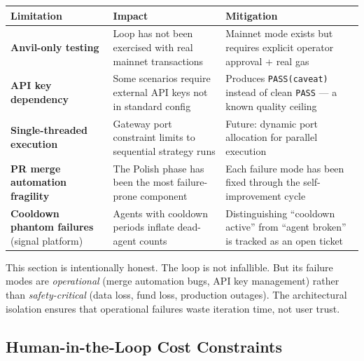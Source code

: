 \documentclass[11pt,a4paper]{article}
\newcounter{none} %
\begin{document}
{\def\LTcaptype{none} %
\begin{longtable}[]{@{}
  >{\raggedright\arraybackslash}p{}
  >{\raggedright\arraybackslash}p{}
  >{\raggedright\arraybackslash}p{}@{}}
\toprule\noalign{}
\begin{minipage}[b]{\linewidth}\raggedright
Limitation
\end{minipage} & \begin{minipage}[b]{\linewidth}\raggedright
Impact
\end{minipage} & \begin{minipage}[b]{\linewidth}\raggedright
Mitigation
\end{minipage} \\
\midrule\noalign{}
\endhead
\bottomrule\noalign{}
\endlastfoot
\textbf{Anvil-only testing} & Loop has not been exercised with real mainnet transactions & Mainnet mode exists but requires explicit operator approval + real gas \\
\textbf{API key dependency} & Some scenarios require external API keys not in standard config & Produces \texttt{PASS(caveat)} instead of clean \texttt{PASS} --- a known quality ceiling \\
\textbf{Single-threaded execution} & Gateway port constraint limits to sequential strategy runs & Future: dynamic port allocation for parallel execution \\
\textbf{PR merge automation fragility} & The Polish phase has been the most failure-prone component & Each failure mode has been fixed through the self-improvement cycle \\
\textbf{Cooldown phantom failures} (signal platform) & Agents with cooldown periods inflate dead-agent counts & Distinguishing ``cooldown active'' from ``agent broken'' is tracked as an open ticket \\
\end{longtable}
}

This section is intentionally honest. The loop is not infallible. But its failure modes are \emph{operational} (merge automation bugs, API key management) rather than \emph{safety-critical} (data loss, fund loss, production outages). The architectural isolation ensures that operational failures waste iteration time, not user trust.

\subsection{Human-in-the-Loop Cost Constraints}\label{sec:human-in-the-loop-cost-constraints}
\end{document}
